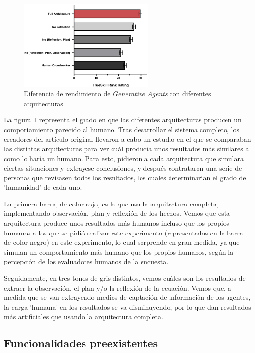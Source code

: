 \begin{figure}[H]
	\centering
	\includegraphics[width = 0.6\textwidth]{Imagenes/Vectorial/difGenAgents.png}
	\caption{Diferencia de rendimiento de \textit{Generative Agents}  con diferentes arquitecturas \citep{park2023generative}}
	\label{fig:difGenAgents}
\end{figure}

La figura \ref{fig:difGenAgents} representa el grado en que las diferentes arquitecturas producen un comportamiento parecido al humano. Tras desarrollar el sistema completo, los creadores del artículo original llevaron a cabo un estudio en el que se comparaban las distintas arquitecturas para ver cuál producía unos resultados más similares a como lo haría un humano. Para esto, pidieron a cada arquitectura que simulara ciertas situaciones y extrayese conclusiones, y después contrataron una serie de personas que revisasen todos los resultados, los cuales determinarían el grado de 'humanidad' de cada uno.

La primera barra, de color rojo, es la que usa la arquitectura completa, implementando observación, plan y reflexión de los hechos. Vemos que esta arquitectura produce unos resultados más humanos incluso que los propios humanos a los que se pidió realizar este experimento (representados en la barra de color negro) en este experimento, lo cual sorprende en gran medida, ya que simulan un comportamiento más humano que los propios humanos, según la percepción de los evaluadores humanos de la encuesta.

Seguidamente, en tres tonos de gris distintos, vemos cuáles son los resultados de extraer la observación, el plan y/o la reflexión de la ecuación. Vemos que, a medida que se van extrayendo medios de captación de información de los agentes, la carga 'humana' en los resultados se va disminuyendo, por lo que dan resultados más artificiales que usando la arquitectura completa.

\subsection{Funcionalidades preexistentes}
\label{genAgents}

